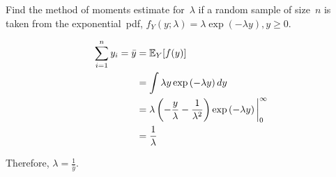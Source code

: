 \begin{problem}
   Find the method of moments estimate for~$\lambda$ if a random sample of size~$n$ is taken from the exponential~pdf, ${f_Y(y;\lambda) = \lambda \exp(-\lambda y), y \geq 0}$.
\end{problem}

\begin{align}
  \sum_{i=1}^{n} y_i = \bar{y} &= \mathbb{E}_{Y}\lbrack f(y)\rbrack \\
                               &= \int \lambda y \exp\left( -\lambda y  \right) dy \\
                               &= \lambda \left(-\frac{y}{\lambda} - \frac{1}{\lambda^2}\right) \exp\left(-\lambda y\right) \bigg\vert_{0}^{\infty} \\
                               &= \frac{1}{\lambda}
\end{align}

Therefore, ${\lambda = \boxed{\frac{1}{\bar{y}}}}$.
